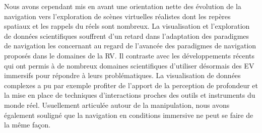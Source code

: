 Nous avons cependant mis en avant une orientation nette des évolution de la navigation vers l'exploration de scènes virtuelles réalistes dont les repères spatiaux et les rappels du réels sont nombreux. La visualisation et l'exploration de données scientifiques souffrent d'un retard dans l'adaptation des paradigmes de navigation les concernant au regard de l'avancée des paradigmes de navigation proposés dans le domaines de la RV.
Il contraste avec les développements récents qui ont permis à de nombreux domaines scientifiques d'utiliser désormais des EV immersifs pour répondre à leurs problématiques. La visualisation de données complexes a pu par exemple profiter de l'apport de la perception de profondeur et la mise en place de techniques d'interactions proches des outils et instruments du monde réel. Usuellement articulée autour de la manipulation, nous avons également souligné que la navigation en conditions immersive ne peut se faire de la même façon. 



